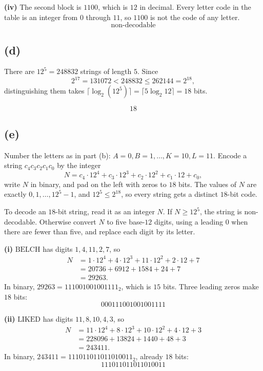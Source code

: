 \documentclass[11pt]{article}
\begin{document}
\textbf{(iv)}
The second block is $1100$, which is $12$ in decimal. Every letter code in the table is an integer from $0$ through $11$, so $1100$ is not the code of any letter.
\[
\boxed{\text{non-decodable}}
\]

\subsection*{(d)}

There are $12^{5}=248832$ strings of length $5$. Since
\[
2^{17}=131072<248832\le 262144=2^{18},
\]
distinguishing them takes $\lceil\log_{2}(12^{5})\rceil=\lceil 5\log_{2} 12\rceil=18$ bits.

\[
\boxed{18}
\]

\subsection*{(e)}

Number the letters as in part (b): $A=0,B=1,\ldots,K=10,L=11$. Encode a string $c_{4}c_{3}c_{2}c_{1}c_{0}$ by the integer
\[
N=c_{4}\cdot 12^{4}+c_{3}\cdot 12^{3}+c_{2}\cdot 12^{2}+c_{1}\cdot 12+c_{0},
\]
write $N$ in binary, and pad on the left with zeros to $18$ bits. The values of $N$ are exactly $0,1,\ldots,12^{5}-1$, and $12^{5}\le 2^{18}$, so every string gets a distinct $18$-bit code.

To decode an $18$-bit string, read it as an integer $N$. If $N\ge 12^{5}$, the string is non-decodable. Otherwise convert $N$ to five base-$12$ digits, using a leading $0$ when there are fewer than five, and replace each digit by its letter.

\textbf{(i)}
$\text{BELCH}$ has digits $1,4,11,2,7$, so
\begin{align*}
N
&= 1\cdot 12^{4}+4\cdot 12^{3}+11\cdot 12^{2}+2\cdot 12+7\\
&= 20736+6912+1584+24+7\\
&= 29263.
\end{align*}
In binary, $29263=111001001001111_{2}$, which is $15$ bits. Three leading zeros make $18$ bits:
\[
\boxed{000111001001001111}
\]

\textbf{(ii)}
$\text{LIKED}$ has digits $11,8,10,4,3$, so
\begin{align*}
N
&= 11\cdot 12^{4}+8\cdot 12^{3}+10\cdot 12^{2}+4\cdot 12+3\\
&= 228096+13824+1440+48+3\\
&= 243411.
\end{align*}
In binary, $243411=111011011011010011_{2}$, already $18$ bits:
\[
\boxed{111011011011010011}
\]
\end{document}

